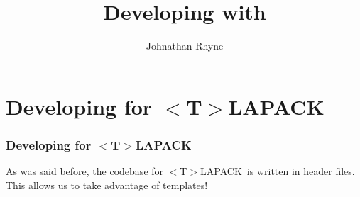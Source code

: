 \documentclass[12pt]{beamer}
\author{Johnathan Rhyne}
\title{Developing with \tla}
\newcommand{\tla}{$<$T$>$LAPACK}
\begin{document}
    \begin{frame}
        \maketitle
    \end{frame}
    \begin{frame}
        \tableofcontents
    \end{frame}
    \section{Developing for \tla}
    \begin{frame}
        \frametitle{Developing for \tla}
        As was said before, the codebase for \tla\, is written in header files. This allows us to 
        take advantage of templates!
    \end{frame}
\end{document}
